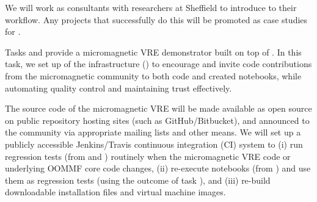 \begin{workpackage}
\begin{tasklist}
\begin{task}[title=Introduce \TheProject to researchers and teachers, id=project-intro,lead=USH,PM=6]
We will work as consultants with researchers at Sheffield to introduce
\TheProject to their workflow. Any projects that successfully do this
will be promoted as case studies for \TheProject.
\end{task}

\begin{task}[id=dissemination-of-oommf-nb-virtual-environment,
  title=Open source dissemination of micromagnetic VRE,
  lead=USO,PM=4]
  Tasks  and 
   provide a micromagnetic
  VRE demonstrator built on top of \TheProject. 
  In this task, we set up of the infrastructure () to encourage and
  invite code contributions from the micromagnetic community to both
  code and created notebooks, while
  automating quality control and maintaining trust effectively. 

  The source code of the micromagnetic VRE will be made available as
  open source on public repository hosting sites (such as
  GitHub/Bitbucket), and announced to the community via appropriate
  mailing lists and other means. We will set up a publicly accessible
  Jenkins/Travis continuous integration (CI) system to (i) run
  regression tests (from
   and
  ) routinely when the
  micromagnetic VRE code or underlying OOMMF core code changes, (ii)
  re-execute notebooks (from
  ) and use them as
  regression tests (using the outcome of task
  ), and (iii) re-build
  downloadable installation files and virtual machine images.


\end{task}

\begin{task}[title=Micromagnetic VRE dissemination workshops,
id=dissemination-of-oommf-nb-workshops,lead=USO,PM=6]



\end{task}
\end{tasklist}
\end{workpackage}
